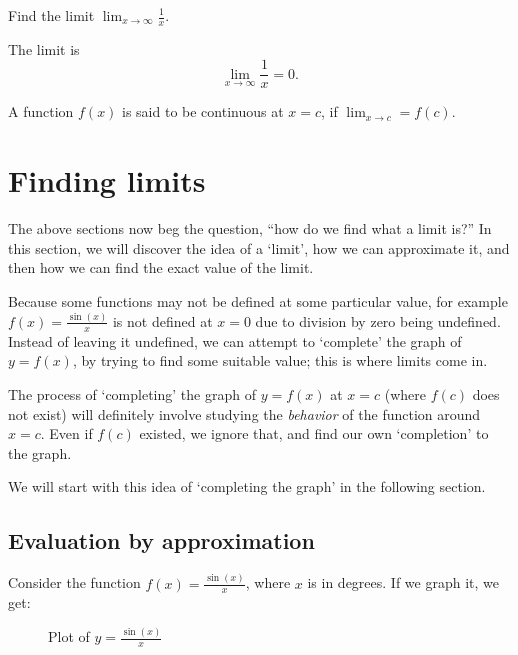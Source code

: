 \begin{example}
    Find the limit $\lim_{x \to \infty} \frac{1}{x}$.
\end{example}
\begin{solution}
    The limit is \[\lim_{x \to \infty} \frac{1}{x} = 0.\]
\end{solution}

A function $f(x)$ is said to be continuous at $x = c$, if $\lim_{x \to c} = f(c)$.

\section{Finding limits}
The above sections now beg the question, ``how do we find what a limit is?'' In this section, we will discover the
idea of a `limit', how we can approximate it, and then how we can find the exact value of the limit.

Because some functions may not be defined at some particular value, for example
$f(x) = \frac{\sin(x)}{x}$ is not defined at $x = 0$ due to division by zero being undefined.
Instead of leaving it undefined, we can attempt to `complete' the graph of $y = f(x)$, by trying
to find some suitable value; this is where limits come in.

The process of `completing' the graph of $y = f(x)$ at $x = c$ (where $f(c)$ does not exist) will
definitely involve studying the \textit{behavior} of the function around $x = c$. Even if $f(c)$ existed,
we ignore that, and find our own `completion' to the graph.

We will start with this idea of `completing the graph' in the following section.

\subsection{Evaluation by approximation}
Consider the function $f(x) = \frac{\sin(x)}{x}$, where $x$ is in degrees. If we graph it, we get:

\begin{figure}[h]
    \centering
    \caption{Plot of $y = \frac{\sin(x)}{x}$}
    \label{fig:sincx}
\end{figure}

